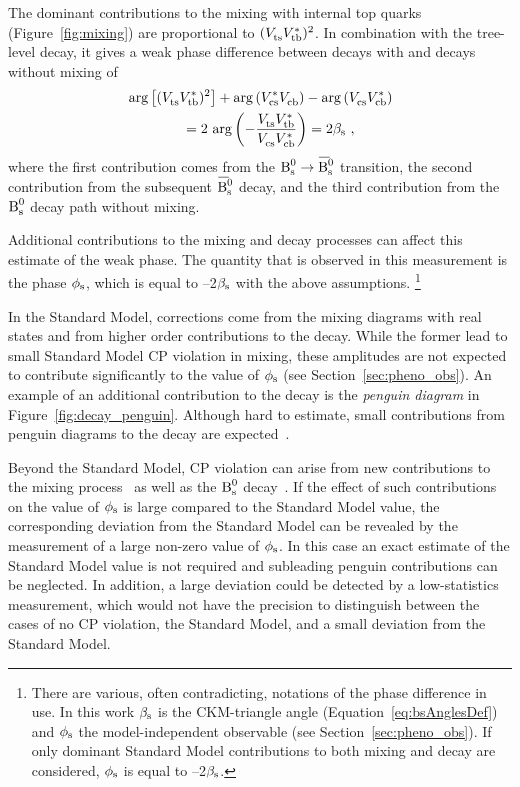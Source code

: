 The dominant contributions to the \BsBsbar{} mixing with internal top quarks (Figure~\ref{fig:mixing}) are proportional to
$(\Vts\Vtb[*])^2$. In combination with the tree-level decay, it gives a weak phase difference between decays with and decays without mixing
of
\begin{equation}
  \label{eq:betasCKM}
  \begin{split}
    &\arg\left[(\Vts\Vtb[*])^2\right] + \arg\left(\Vcs[*]\Vcb\right) - \arg\left(\Vcs\Vcb[*]\right) \\
    &\qquad\qquad= 2\,\arg\left(-\frac{\Vts\Vtb[*]}{\Vcs\Vcb[*]}\right) = 2\bs
    \ ,
  \end{split}
\end{equation}
where the first contribution comes from the $\Bs\to\Bsbar$ transition, the second contribution from the subsequent $\Bsbar$ decay, and the
third contribution from the $\text{B}_\text{s}^\text{0}$ decay path without mixing.

Additional contributions to the mixing and decay processes can affect this estimate of the weak phase. The quantity that is observed in
this measurement is the phase $\phi_\text{s}$, which is equal to --2$\beta_\text{s}$ with the above assumptions.%
\footnote{There are various, often contradicting, notations of the phase difference in use. In this work $\beta_\text{s}$ is the CKM-triangle angle
(Equation~\ref{eq:bsAnglesDef}) and $\phi_\text{s}$ the model-independent observable (see Section~\ref{sec:pheno_obs}). If only dominant Standard
Model contributions to both mixing and decay are considered, $\phi_\text{s}$ is equal to --2$\beta_\text{s}$.}

In the Standard Model, corrections come from the mixing diagrams with real states and from higher order contributions to the decay.  While
the former lead to small Standard Model CP violation in mixing, these amplitudes are not expected to contribute significantly to the value
of $\phi_\text{s}$ (see Section~\ref{sec:pheno_obs}). An example of an additional contribution to the decay is the \emph{penguin diagram} in
Figure~\ref{fig:decay_penguin}. Although hard to estimate, small contributions from penguin diagrams to the decay are
expected~\cite{Faller:2008gt,*Bhattacharya:2012ph}.

Beyond the Standard Model, CP violation can arise from new contributions to the \BsBsbar{} mixing
process~\cite{Nir:1990hj,*Silverman:1998uj,*Ball:1999yi,*Dunietz:2000cr,Buras:2009if} as well as the $\text{B}_\text{s}^\text{0}$
decay~\cite{Chiang:2009ev,*Datta:2009fk}. If the effect of such contributions on the value of $\phi_\text{s}$ is large compared to the Standard
Model value, the corresponding deviation from the Standard Model can be revealed by the measurement of a large non-zero value of $\phi_\text{s}$.
In this case an exact estimate of the Standard Model value is not required and subleading penguin contributions can be neglected. In
addition, a large deviation could be detected by a low-statistics measurement, which would not have the precision to distinguish between
the cases of no CP violation, the Standard Model, and a small deviation from the Standard Model.

